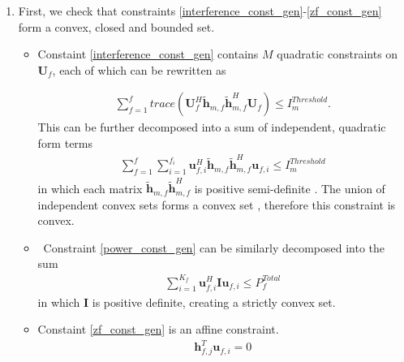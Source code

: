 \documentclass[12pt,a4paper]{report}
\begin{document}
\begin{enumerate}
\item
First, we check that constraints \eqref{interference_const_gen}-\eqref{zf_const_gen} form a convex, closed and bounded set. 

\begin{itemize}

\item
	Constaint \eqref{interference_const_gen} contains $M$ quadratic constraints on $\mathbf{U}_f$, each of which 
	can be rewritten  as

\begin{gather*}
	\sum_{f=1}^{f}
	trace(\mathbf{U}_{f}^H \mathbf{\tilde{h}}_{m,f} \mathbf{\tilde{h}}_{m,f}^H \mathbf{U}_f )\leq 
	I^{Threshold}_{m}.
\end{gather*}
This can be further decomposed into a sum of independent, quadratic form terms
	\begin{gather*}
	\sum_{f=1}^{f}
	\sum_{i=1}^{f_i}
	\mathbf{u}_{f,i}^H\mathbf{\tilde{h}}_{m,f} \mathbf{\tilde{h}}_{m,f}^H
	\mathbf{u}_{f,i} \leq I^{Threshold}_{m}
	\end{gather*}
in which each matrix $\mathbf{\tilde{h}}_{m,f} \mathbf{\tilde{h}}_{m,f}^H$ is positive semi-definite \cite[p.~8,9]{BoV:04}. The union of independent convex sets forms a convex set \cite{BoV:04}, therefore this constraint is convex. 

\item \
	Constraint \eqref{power_const_gen} can be similarly decomposed into the sum
	\begin{gather*}
		\sum_{i=1}^{K_{f}}\mathbf{u}_{f,i}^{H} \mathbf{I} 		
		\mathbf{u}_{f,i} \leq  P^{Total}_{f}
	\end{gather*}
	in which $\mathbf{I}$ is positive definite, creating a strictly convex set.

\item 
	Constaint \eqref{zf_const_gen} is an affine constraint. 
		\begin{gather*}
		\mathbf{h}_{f,j}^T \mathbf{u}_{f,i} =0
		\end{gather*}
\end{itemize}



\end{enumerate}
\end{document}
